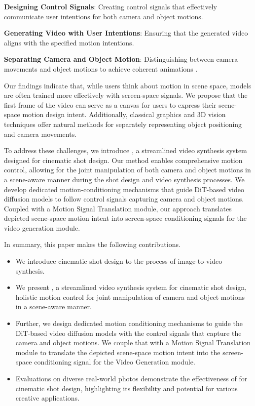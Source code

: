 \textbf{Designing Control Signals}: Creating control signals that effectively communicate  user intentions for both camera and object motions.

\textbf{Generating Video with User Intentions}: Ensuring that the generated video aligns with the specified motion intentions.

\textbf{Separating Camera and Object Motion}: Distinguishing between camera movements and object motions to achieve coherent animations .

Our findings indicate that, while users think about motion in scene space, models are often trained more effectively with screen-space signals. We propose that the first frame of the video can serve as a canvas for users to express their scene-space motion design intent. Additionally, classical graphics and 3D vision techniques offer natural methods for separately representing object positioning and camera movements.

To address these challenges, we introduce \MOCA, a streamlined video synthesis system designed for cinematic shot design. Our method enables comprehensive motion control, allowing for the joint manipulation of both camera and object motions in a scene-aware manner during the shot design and video synthesis processes. We develop dedicated motion-conditioning mechanisms that guide DiT-based video diffusion models to follow control signals capturing camera and object motions. Coupled with a Motion Signal Translation module, our approach translates depicted scene-space motion intent into screen-space conditioning signals for the video generation module.

In summary, this paper makes the following contributions.

\begin{itemize} 
%
\item We introduce cinematic shot design to the process of image-to-video synthesis. 
%
\item We present \MOCA, a streamlined video synthesis system for cinematic shot design, 
 holistic motion control 
for joint manipulation of camera and object motions in a scene-aware manner. 
%
\item 
Further, we design dedicated motion conditioning mechanisms to guide the DiT-based video diffusion models with 
the control signals that capture the camera and object motions. We couple that with a Motion Signal Translation module to translate the depicted scene-space motion intent into the screen-space conditioning signal for the Video Generation module. 
%
\item Evaluations on diverse 
real-world photos 
demonstrate the effectiveness of \MOCA for cinematic shot design, highlighting its flexibility and potential for various creative applications. 
%
\end{itemize}
